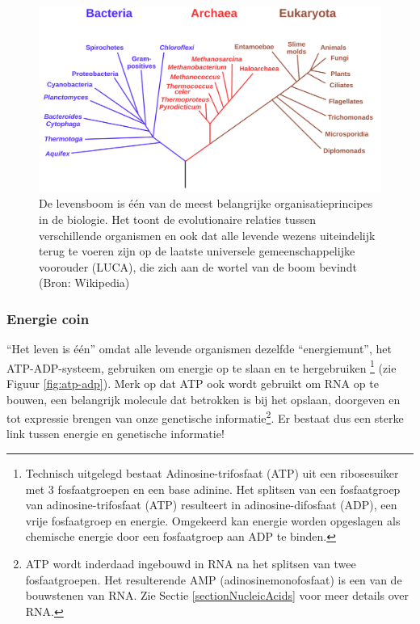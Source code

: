 \documentclass[
  11pt,
]{book}
\begin{document}
\begin{figure}

{\centering \includegraphics[width=0.8\linewidth]{./figs/Phylogenetic_tree} 

}

\caption{De levensboom is één van de meest belangrijke organisatieprincipes in de biologie. Het toont de evolutionaire relaties tussen verschillende organismen en ook dat alle levende wezens uiteindelijk terug te voeren zijn op de laatste universele gemeenschappelijke voorouder (LUCA), die zich aan de wortel van de boom bevindt (Bron: Wikipedia)}\label{fig:treeOfLife}
\end{figure}

\hypertarget{sectionEnergyCoin}{%
\subsubsection{Energie coin}\label{sectionEnergyCoin}}

``Het leven is één'' omdat alle levende organismen dezelfde ``energiemunt'', het ATP-ADP-systeem, gebruiken om energie op te slaan en te hergebruiken \footnote{Technisch uitgelegd bestaat Adinosine-trifosfaat (ATP) uit een ribosesuiker met 3 fosfaatgroepen en een base adinine. Het splitsen van een fosfaatgroep van adinosine-trifosfaat (ATP) resulteert in adinosine-difosfaat (ADP), een vrije fosfaatgroep en energie. Omgekeerd kan energie worden opgeslagen als chemische energie door een fosfaatgroep aan ADP te binden.} (zie Figuur \ref{fig:atp-adp}).
Merk op dat ATP ook wordt gebruikt om RNA op te bouwen, een belangrijk molecule dat betrokken is bij het opslaan, doorgeven en tot expressie brengen van onze genetische informatie\footnote{ATP wordt inderdaad ingebouwd in RNA na het splitsen van twee fosfaatgroepen. Het resulterende AMP (adinosinemonofosfaat) is een van de bouwstenen van RNA. Zie Sectie \ref{sectionNucleicAcids} voor meer details over RNA.}. Er bestaat dus een sterke link tussen energie en genetische informatie!
\end{document}
